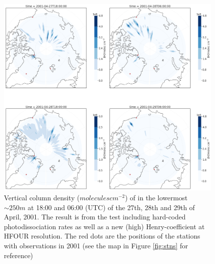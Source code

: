 \begin{figure}[h]
    \centering
    \includegraphics[width=\linewidth]{Chapter6_Results/images/polarBrO_HTWO_step3.png}
    \caption{Vertical column density ($molecules cm^{-2}$) of  in the lowermost $\sim 250 m$ at 18:00 and 06:00 (UTC) of the 27th, 28th and 29th of April, 2001. The result is from the test including hard-coded photodissociation rates as well as a new (high) Henry-coefficient at HFOUR resolution. The red dots are the positions of the stations with observations in 2001 (see the map in Figure \ref{fig:stns} for reference)}
    \label{fig:polarBrO_HTWO_step3}
\end{figure}